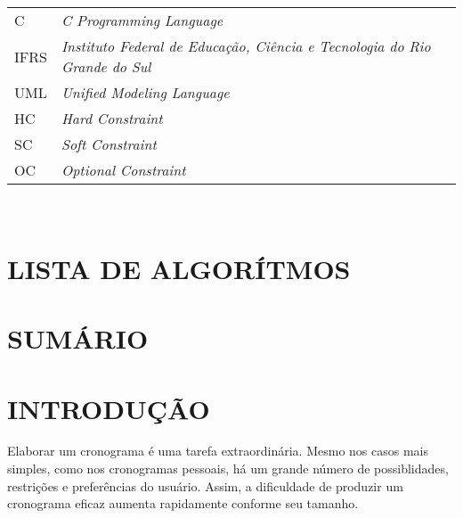 \documentclass[12pt,a4paper]{article}
\begin{document}
	\begin{tabular}{p{3cm} p{}}
	  C & \textit{C Programming Language} \\
	  IFRS & \textit{Instituto Federal de Educação, Ciência e Tecnologia do Rio Grande do Sul} \\
	  UML & \textit{Unified Modeling Language} \\
	  HC & \textit{Hard Constraint} \\
	  SC & \textit{Soft Constraint} \\
	  OC & \textit{Optional Constraint}
	\end{tabular}\\


	\newpage


	\thispagestyle{empty}
	\section*{LISTA DE ALGORÍTMOS}


	\newpage



	\thispagestyle{empty}
	\section*{SUMÁRIO}

	\begingroup
		\let\clearpage\relax
		\vspace{-1cm} %
		\tableofcontents
	\endgroup

	\newpage


	\section{INTRODUÇÃO}



		\par Elaborar um cronograma é uma tarefa extraordinária. Mesmo nos casos mais simples, como nos cronogramas pessoais, há um grande número de possiblidades, restrições e preferências do usuário. Assim, a dificuldade de produzir um cronograma eficaz aumenta rapidamente conforme seu tamanho.
\end{document}
